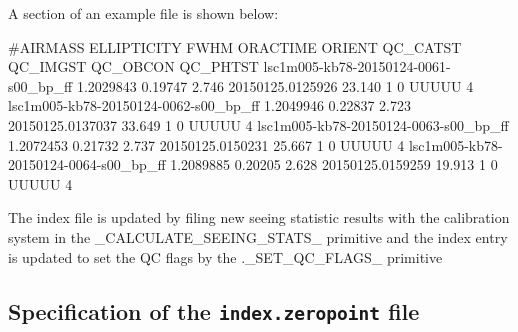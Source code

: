 \documentclass[twoside,11pt,nolof]{starlink}
\providecommand{\task}[1]{\textsf{#1}}
\begin{document}
A section of an example file is shown below:
\begin{terminalv}
#AIRMASS ELLIPTICITY FWHM ORACTIME ORIENT QC_CATST QC_IMGST QC_OBCON QC_PHTST
lsc1m005-kb78-20150124-0061-s00_bp_ff 1.2029843 0.19747 2.746 20150125.0125926 23.140 1 0 UUUUU 4
lsc1m005-kb78-20150124-0062-s00_bp_ff 1.2049946 0.22837 2.723 20150125.0137037 33.649 1 0 UUUUU 4
lsc1m005-kb78-20150124-0063-s00_bp_ff 1.2072453 0.21732 2.737 20150125.0150231 25.667 1 0 UUUUU 4
lsc1m005-kb78-20150124-0064-s00_bp_ff 1.2089885 0.20205 2.628 20150125.0159259 19.913 1 0 UUUUU 4
\end{terminalv}

The index file is updated by filing new seeing statistic results with the
calibration system in the \task{\_CALCULATE\_SEEING\_STATS\_} primitive and the
index entry is updated to set the QC flags by the .\task{\_SET\_QC\_FLAGS\_} primitive

\subsection{Specification of the \texttt{index.zeropoint} file\label{ap:index.zeropoint}}
\end{document}
